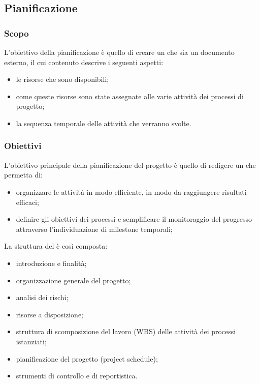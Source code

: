 \subsection{Pianificazione}

\subsubsection{Scopo}
L'obiettivo della pianificazione è quello di creare un \PdPdocumento che sia un documento esterno, il cui contenuto descrive i seguenti aspetti:
\begin{itemize}
    \item le risorse che sono disponibili;
    \item come queste risorse sono state assegnate alle varie attività dei processi di progetto;
    \item la sequenza temporale delle attività che verranno svolte.
\end{itemize}

\subsubsection{Obiettivi}
L'obiettivo principale della pianificazione del progetto è quello di redigere un \PdPdocumento che permetta di:
\begin{itemize}
    \item organizzare le attività in modo efficiente, in modo da raggiungere risultati efficaci;
    \item definire gli obiettivi dei processi e semplificare il monitoraggio del progresso attraverso l'individuazione di milestone temporali;
\end{itemize}
La struttura del \PdPdocumento è così composta:
\begin{itemize}
    \item introduzione e finalità;
    \item organizzazione generale del progetto;
    \item analisi dei rischi;
    \item risorse a disposizione;
    \item struttura di scomposizione del lavoro (WBS) delle attività dei processi istanziati;
    \item pianificazione del progetto (project schedule);
    \item strumenti di controllo e di reportistica.
\end{itemize}

